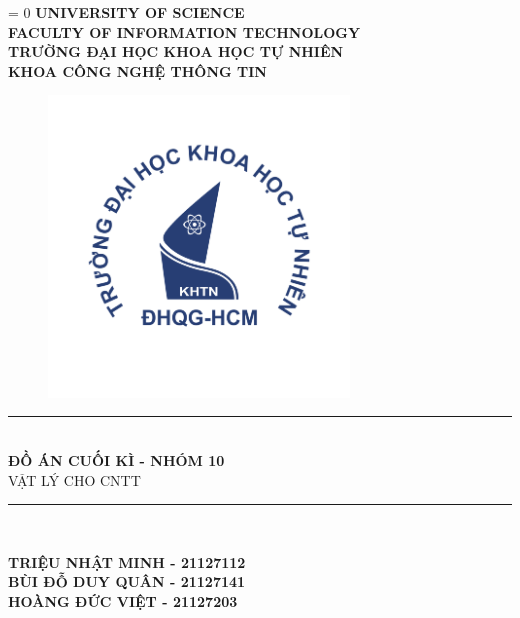 \documentclass{report}
\def\lang{1} %
\begin{document}
\begin{titlepage}



\begin{center}
\ifnum\lang = 0
    \textbf{\Large UNIVERSITY OF SCIENCE}\\[0.2cm]
    \textbf{\Large FACULTY OF INFORMATION TECHNOLOGY}\\
\else
    \textbf{\Large TRƯỜNG ĐẠI HỌC KHOA HỌC TỰ NHIÊN}\\
    \textbf{\Large KHOA CÔNG NGHỆ THÔNG TIN}\\
\fi

\begin{figure}[!h]
    \centering
    \includegraphics[width=8cm, height=8cm]{KHTN.png}
\end{figure}

\rule{\textwidth}{1pt} \\[0.4cm]
{\huge \bfseries ĐỒ ÁN CUỐI KÌ - NHÓM 10}\\[0.4cm]
\textsc{\Large VẬT LÝ CHO CNTT}
\rule{\textwidth}{1pt} \\[1cm]

\begin{center}
    \textbf{\Large TRIỆU NHẬT MINH - 21127112}\\
    \textbf{\Large BÙI ĐỖ DUY QUÂN - 21127141}\\
    \textbf{\Large HOÀNG ĐỨC VIỆT - 21127203}\\[3cm]
\end{center}


\end{center}
\end{titlepage}
\end{document}
